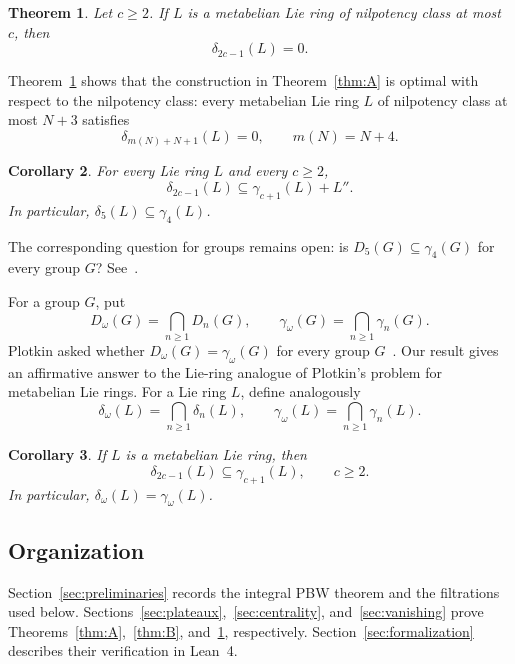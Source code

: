\documentclass[a4paper,11pt,reqno]{amsart}
\newtheorem{maintheorem}{Theorem}
\newtheorem{maincorollary}[maintheorem]{Corollary}
\theoremstyle{definition}
\begin{document}
\begin{maintheorem}\label{thm:C}
Let $c\geq2$.  If $L$ is a metabelian Lie ring of nilpotency class at most
$c$, then
\[
                              \delta_{2c-1}(L)=0.
\]
\end{maintheorem}

Theorem~\ref{thm:C} shows that the construction in Theorem~\ref{thm:A} is
optimal with respect to the nilpotency class: every metabelian Lie ring
$L$ of nilpotency class at most $N+3$ satisfies
\[
             \delta_{m(N)+N+1}(L)=0,
             \qquad m(N)=N+4.
\]

\begin{maincorollary}\label{cor:D}
For every Lie ring $L$ and every $c\geq2$,
\[
              \delta_{2c-1}(L)\subseteq\gamma_{c+1}(L)+L''.
\]
In particular, $\delta_5(L)\subseteq\gamma_4(L)$.
\end{maincorollary}

The corresponding question for groups remains open: is
$D_5(G)\subseteq\gamma_4(G)$ for every group $G$?
See~\cite[Problem~20.84]{KourovkaNotebook20}.

For a group $G$, put
\[
 D_\omega(G)=\bigcap_{n\geq1}D_n(G),
 \qquad
 \gamma_\omega(G)=\bigcap_{n\geq1}\gamma_n(G).
\]
Plotkin asked whether $D_\omega(G)=\gamma_\omega(G)$ for every group
$G$~\cite{Plotkin1973}.  Our result gives an affirmative answer to the
Lie-ring analogue of Plotkin's problem for metabelian Lie rings.  For a
Lie ring $L$, define analogously
\[
 \delta_\omega(L)=\bigcap_{n\geq1}\delta_n(L),
 \qquad
 \gamma_\omega(L)=\bigcap_{n\geq1}\gamma_n(L).
\]

\begin{maincorollary}\label{cor:E}
If $L$ is a metabelian Lie ring, then
\[
              \delta_{2c-1}(L)\subseteq\gamma_{c+1}(L),
              \qquad c\geq2.
\]
In particular, $\delta_\omega(L)=\gamma_\omega(L)$.
\end{maincorollary}

\subsection{Organization}

Section~\ref{sec:preliminaries} records the integral PBW theorem and the
filtrations used below.  Sections~\ref{sec:plateaux},~\ref{sec:centrality},
and~\ref{sec:vanishing} prove
Theorems~\ref{thm:A},~\ref{thm:B}, and~\ref{thm:C}, respectively.
Section~\ref{sec:formalization} describes their verification in Lean~4.
\end{document}
